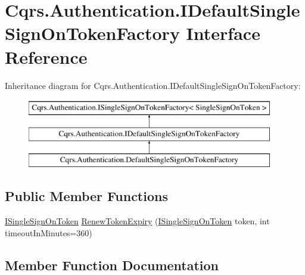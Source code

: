 \hypertarget{interfaceCqrs_1_1Authentication_1_1IDefaultSingleSignOnTokenFactory}{}\section{Cqrs.\+Authentication.\+I\+Default\+Single\+Sign\+On\+Token\+Factory Interface Reference}
\label{interfaceCqrs_1_1Authentication_1_1IDefaultSingleSignOnTokenFactory}
Inheritance diagram for Cqrs.\+Authentication.\+I\+Default\+Single\+Sign\+On\+Token\+Factory\+:\begin{figure}[H]
\begin{center}
\leavevmode
\includegraphics[height=3.000000cm]{interfaceCqrs_1_1Authentication_1_1IDefaultSingleSignOnTokenFactory}
\end{center}
\end{figure}
\subsection*{Public Member Functions}
\begin{DoxyCompactItemize}
\item 
\hyperlink{interfaceCqrs_1_1Authentication_1_1ISingleSignOnToken}{I\+Single\+Sign\+On\+Token} \hyperlink{interfaceCqrs_1_1Authentication_1_1IDefaultSingleSignOnTokenFactory_aff3e7060705a3a8e021c1182ce101b33_aff3e7060705a3a8e021c1182ce101b33}{Renew\+Token\+Expiry} (\hyperlink{interfaceCqrs_1_1Authentication_1_1ISingleSignOnToken}{I\+Single\+Sign\+On\+Token} token, int timeout\+In\+Minutes=360)
\end{DoxyCompactItemize}


\subsection{Member Function Documentation}
\mbox{\label{interfaceCqrs_1_1Authentication_1_1IDefaultSingleSignOnTokenFactory_aff3e7060705a3a8e021c1182ce101b33_aff3e7060705a3a8e021c1182ce101b33}} 
